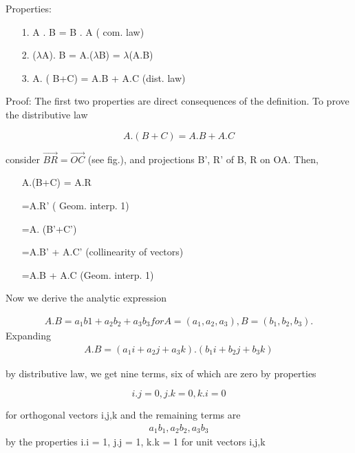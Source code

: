 \documentclass{article}
\begin{document}

Properties: 
  \begin{itemize}
\item[1.] A . B = B .  A ( com. law)
\item[2.] ($\lambda$A). B = A.($\lambda$B) =  $\lambda$(A.B)  
\item[3.] A. ( B+C) = A.B + A.C (dist. law)
\end{itemize}
Proof:
The first two properties are direct consequences of the definition.
To prove the distributive law 
 
\begin{equation}
A. ( B+C) = A.B + A.C
 \end{equation}


consider $\vec{BR} = \vec{OC}$ (see fig.), and projections B', R' of B, R on OA. Then, 

\begin{itemize}
  \item[] A.(B+C) = A.R
  \item[] =A.R' ( Geom. interp. 1) 
  \item[] =A. (B'+C') 
  \item[] =A.B' + A.C' (collinearity of vectors)
  \item[] =A.B + A.C (Geom. interp. 1)
\end{itemize}

Now we derive the analytic expression

\begin{align}
A.B = a_{1}b{1} + a_{2}b_{2} + a_{3}b_{3} 
for A = ( a_{1},a_{2},a_{3} ), B=( b_{1}, b_{2}, b_{3} ). 
\end{align}
Expanding 
\begin{align}
A.B = (a_{1}i + a_{2}j + a_{3}k). (b_{1}i + b_{2}j + b_{3}k) 
\end{align}

by distributive law, we get nine terms, six of which are zero by properties

\begin {equation}
i.j = 0,  j.k = 0, k.i = 0
\end {equation}

for orthogonal vectors i,j,k and the remaining terms are 
\begin {align}
a_{1}b_{1}, a_{2}b_{2}, a_{3}b_{3} 
\end{align}
by the properties
i.i = 1,  j.j = 1, k.k = 1 for unit vectors i,j,k
\end{document}
